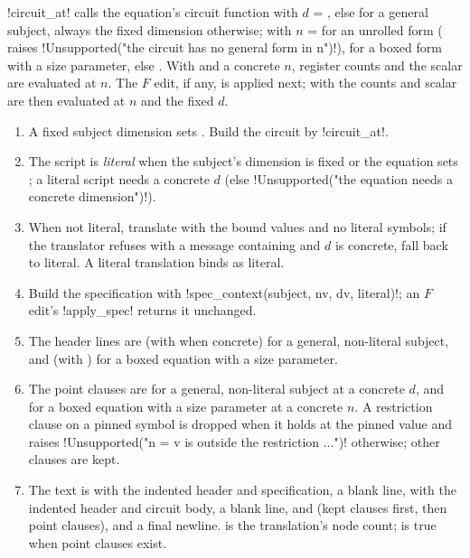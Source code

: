 \py!circuit_at! calls the equation's circuit function with $d$ = , else  for a
general subject, always the fixed dimension otherwise; with $n$ =  for an unrolled form
( raises \py!Unsupported("the circuit has no general form in n")!), 
for a boxed form with a size parameter, else . With  and a concrete $n$,
register counts and the scalar are evaluated at $n$. The $F$ edit, if any, is applied next;
with  the counts and scalar are then evaluated at $n$ and the fixed $d$.

\begin{algorithm}\label{alg:bench-script}
\begin{enumerate}
\item A fixed subject dimension sets . Build the circuit by \py!circuit_at!.
\item The script is \emph{literal} when the subject's dimension is fixed or the equation sets
  ; a literal script needs a concrete $d$ (else \py!Unsupported("the equation needs a concrete dimension")!).
\item When not literal, translate with the bound values and no literal symbols; if the
  translator refuses with a message containing  and $d$ is concrete, fall back to
  literal. A literal translation binds  as literal.
\item Build the specification with \py!spec_context(subject, nv, dv, literal)!; an $F$ edit's
  \py!apply_spec! returns it unchanged.
\item The header lines are  (with  when concrete) for a general,
  non-literal subject, and  (with ) for a boxed equation with a size
  parameter.
\item The point clauses are  for a general, non-literal subject at a concrete $d$,
  and  for a boxed equation with a size parameter at a concrete $n$. A restriction
  clause on a pinned symbol is dropped when it holds at the pinned value and raises
  \py!Unsupported("n = v is outside the restriction ...")! otherwise; other clauses are kept.
\item The text is  with the indented header and specification, a blank line,
   with the indented header and circuit body, a blank line, and
   (kept clauses first, then point clauses), and a
  final newline.  is the translation's node count;  is true when
  point clauses exist.
\end{enumerate}
\end{algorithm}

